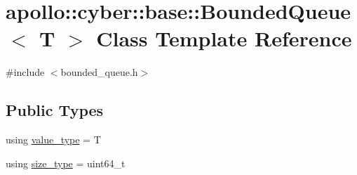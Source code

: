 \hypertarget{classapollo_1_1cyber_1_1base_1_1BoundedQueue}{\section{apollo\-:\-:cyber\-:\-:base\-:\-:Bounded\-Queue$<$ T $>$ Class Template Reference}
\label{classapollo_1_1cyber_1_1base_1_1BoundedQueue}
}


{\ttfamily \#include $<$bounded\-\_\-queue.\-h$>$}

\subsection*{Public Types}
\begin{DoxyCompactItemize}
\item 
using \hyperlink{classapollo_1_1cyber_1_1base_1_1BoundedQueue_a7ed1030141bc62c66ce2c41b6bfdfa58}{value\-\_\-type} = T
\item 
using \hyperlink{classapollo_1_1cyber_1_1base_1_1BoundedQueue_a3e14c54e4e45f2c586432a976e455e84}{size\-\_\-type} = uint64\-\_\-t
\end{DoxyCompactItemize}
